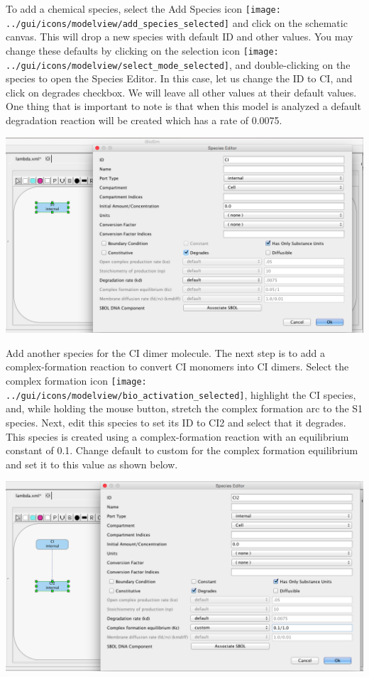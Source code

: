 \documentclass[titlepage,11pt]{article}
\begin{document}
To add a chemical species, select the Add Species icon \texttt{[image: ../gui/icons/modelview/add\_species\_selected]} and click on the schematic canvas.  This will drop a new species with default ID and other values.  You may change these defaults by clicking on the selection icon 
\texttt{[image: ../gui/icons/modelview/select\_mode\_selected]}, and
double-clicking on the species to open the Species Editor.  In this case, let us change the ID to CI, and click on degrades checkbox.  We will leave all other values at their default values.  One thing that is important to note is that when this model is analyzed a default degradation reaction will be created which has a rate of 0.0075.  

\begin{center}
\includegraphics[width=160mm]{screenshots/species}
\end{center}

Add another species for the CI dimer molecule.  The next step is to add a complex-formation reaction to convert CI monomers into CI dimers.  Select the complex formation icon \texttt{[image: ../gui/icons/modelview/bio\_activation\_selected]}, highlight the CI species, and, while holding the mouse button, stretch the complex formation arc to the S1 species.  Next, edit this species to set its ID to CI2 and select that it degrades.  This species is created using a complex-formation reaction with an equilibrium constant of 0.1.  Change default to custom for the complex formation equilibrium and set it to this value as shown below.

\begin{center}
\includegraphics[width=160mm]{screenshots/species2} 
\end{center}
\end{document}
